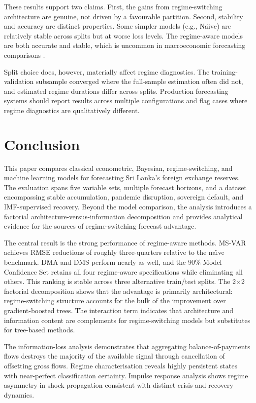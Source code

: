 \documentclass[12pt,a4paper]{article}
\begin{document}
These results support two claims. First, the gains from regime-switching architecture are genuine, not driven by a favourable partition. Second, stability and accuracy are distinct properties. Some simpler models (e.g., Na\"{\i}ve) are relatively stable across splits but at worse loss levels. The regime-aware models are both accurate and stable, which is uncommon in macroeconomic forecasting comparisons \citep{Rossi2013}.

Split choice does, however, materially affect regime diagnostics. The training-validation subsample converged where the full-sample estimation often did not, and estimated regime durations differ across splits. Production forecasting systems should report results across multiple configurations and flag cases where regime diagnostics are qualitatively different.

\section{Conclusion}

This paper compares classical econometric, Bayesian, regime-switching, and machine learning models for forecasting Sri Lanka's foreign exchange reserves. The evaluation spans five variable sets, multiple forecast horizons, and a dataset encompassing stable accumulation, pandemic disruption, sovereign default, and IMF-supervised recovery. Beyond the model comparison, the analysis introduces a factorial architecture-versus-information decomposition and provides analytical evidence for the sources of regime-switching forecast advantage.

The central result is the strong performance of regime-aware methods. MS-VAR achieves RMSE reductions of roughly three-quarters relative to the na\"{\i}ve benchmark. DMA and DMS perform nearly as well, and the 90\% Model Confidence Set retains all four regime-aware specifications while eliminating all others. This ranking is stable across three alternative train/test splits. The 2$\times$2 factorial decomposition shows that the advantage is primarily architectural: regime-switching structure accounts for the bulk of the improvement over gradient-boosted trees. The interaction term indicates that architecture and information content are complements for regime-switching models but substitutes for tree-based methods.

The information-loss analysis demonstrates that aggregating balance-of-payments flows destroys the majority of the available signal through cancellation of offsetting gross flows. Regime characterisation reveals highly persistent states with near-perfect classification certainty. Impulse response analysis shows regime asymmetry in shock propagation consistent with distinct crisis and recovery dynamics.
\end{document}
